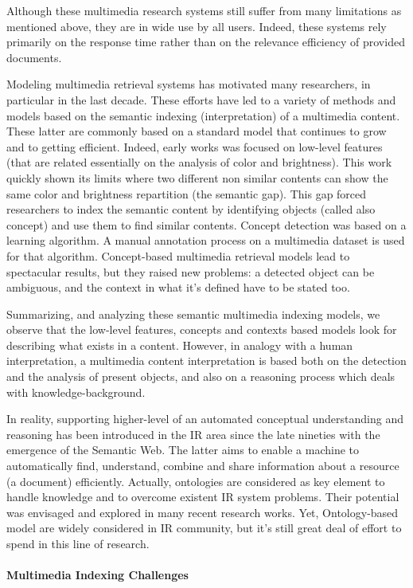 	Although these multimedia research systems still suffer from many limitations as mentioned above, they are in wide use by all users. Indeed, these systems rely primarily on the response time rather than on the relevance efficiency of provided documents.
	
	Modeling multimedia retrieval systems has motivated many researchers, in particular in the last decade. These efforts have led to a variety of methods and models based on the semantic indexing (interpretation) of a multimedia content. These latter are commonly based on a standard model that continues to grow and to getting efficient. Indeed, early works was focused on low-level features (that are related essentially on the analysis of color and brightness). This work quickly shown its limits where two different non similar contents can show the same color and brightness repartition (the semantic gap). This gap forced researchers to index the semantic content by identifying objects (called also concept) and use them to find similar contents. Concept detection was based on a learning algorithm. A manual annotation process on a multimedia dataset is used for that algorithm. Concept-based multimedia retrieval models lead to spectacular results, but they raised new problems: a detected object can be ambiguous, and the context in what it's defined have to be stated too.
	
	Summarizing, and analyzing these semantic multimedia indexing models, we observe that the low-level features, concepts and contexts based models look for describing what exists in a content. However, in analogy with a human interpretation, a multimedia content interpretation is based both on the detection and the analysis of present objects, and also on a reasoning process which deals with knowledge-background.
	
	In reality, supporting higher-level of an automated conceptual understanding and reasoning has been introduced in the IR area since the late nineties with the emergence of the Semantic Web. The latter aims to enable a machine to automatically find, understand, combine and share information about a resource (a document) efficiently. Actually, ontologies are considered as key element to handle knowledge and to overcome existent IR system problems. Their potential was envisaged and explored in many recent research works. Yet, Ontology-based model are widely considered in IR community, but it's still great deal of effort to spend in this line of research.
	
	\paragraph{Multimedia Indexing Challenges}
	
